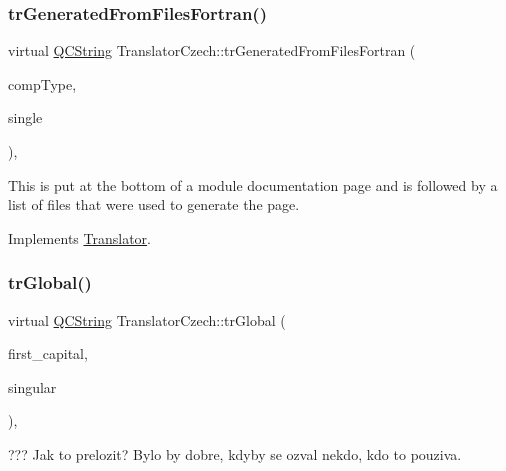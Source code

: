 \mbox{\label{class_translator_czech_a630896cd6dc9b3676a679e621773be14}} 
\subsubsection{\texorpdfstring{trGeneratedFromFilesFortran()}{trGeneratedFromFilesFortran()}}
{\footnotesize\ttfamily virtual \mbox{\hyperlink{class_q_c_string}{Q\+C\+String}} Translator\+Czech\+::tr\+Generated\+From\+Files\+Fortran (\begin{DoxyParamCaption}\item[{\mbox{\hyperlink{class_class_def_ae70cf86d35fe954a94c566fbcfc87939}{Class\+Def\+::\+Compound\+Type}}}]{comp\+Type,  }\item[{bool}]{single }\end{DoxyParamCaption})\hspace{0.3cm}{\ttfamily [inline]}, {\ttfamily [virtual]}}

This is put at the bottom of a module documentation page and is followed by a list of files that were used to generate the page. 

Implements \mbox{\hyperlink{class_translator}{Translator}}.

\mbox{\label{class_translator_czech_a698757d212a12df7f650c4dc82df12e1}} 
\subsubsection{\texorpdfstring{trGlobal()}{trGlobal()}}
{\footnotesize\ttfamily virtual \mbox{\hyperlink{class_q_c_string}{Q\+C\+String}} Translator\+Czech\+::tr\+Global (\begin{DoxyParamCaption}\item[{bool}]{first\+\_\+capital,  }\item[{bool}]{singular }\end{DoxyParamCaption})\hspace{0.3cm}{\ttfamily [inline]}, {\ttfamily [virtual]}}

??? Jak to prelozit? Bylo by dobre, kdyby se ozval nekdo, kdo to pouziva. 

